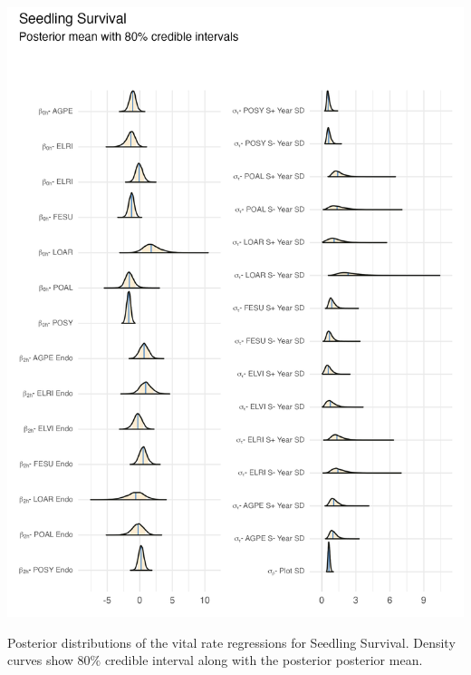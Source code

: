 \documentclass[lineno, sn-basic]{sn-jnl}%
\providecommand{\DIFaddbegin}{} %
\providecommand{\DIFaddend}{} %
\providecommand{\DIFdelbegin}{} %
\providecommand{\DIFdelend}{} %
\providecommand{\DIFaddbeginFL}{} %
\providecommand{\DIFaddendFL}{} %
\providecommand{\DIFdelbeginFL}{} %
\providecommand{\DIFdelendFL}{} %
\newcommand{\DIFscaledelfig}{0.5}
\newlength{\DIFdelgraphicswidth} %
\newlength{\DIFdelgraphicsheight} %
\newcommand{\DIFaddincludegraphics}[2][]{{\color{blue}\fbox{\DIFOincludegraphics[#1]{#2}}}} %
\newcommand{\DIFdelincludegraphics}[2][]{%
\sbox{\DIFdelgraphicsbox}{\DIFOincludegraphics[#1]{#2}}%
\settoboxwidth{\DIFdelgraphicswidth}{\DIFdelgraphicsbox} %
\settoboxtotalheight{\DIFdelgraphicsheight}{\DIFdelgraphicsbox} %
\scalebox{\DIFscaledelfig}{%
\parbox[b]{\DIFdelgraphicswidth}{\usebox{\DIFdelgraphicsbox}\\[-\baselineskip] \rule{\DIFdelgraphicswidth}{0em}}\llap{\resizebox{\DIFdelgraphicswidth}{\DIFdelgraphicsheight}{%
\setlength{\unitlength}{\DIFdelgraphicswidth}%
\begin{picture}(1,1)%
\thicklines\linethickness{2pt} %
{\color[rgb]{1,0,0}\put(0,0){\framebox(1,1){}}}%
{\color[rgb]{1,0,0}\put(0,0){\line( 1,1){1}}}%
{\color[rgb]{1,0,0}\put(0,1){\line(1,-1){1}}}%
\end{picture}%
}\hspace*{3pt}}} %
} %
\DeclareRobustCommand{\DIFaddbegin}{\DIFOaddbegin \let\includegraphics\DIFaddincludegraphics} %
\DeclareRobustCommand{\DIFaddend}{\DIFOaddend \let\includegraphics\DIFOincludegraphics} %
\DeclareRobustCommand{\DIFdelbegin}{\DIFOdelbegin \let\includegraphics\DIFdelincludegraphics} %
\DeclareRobustCommand{\DIFdelend}{\DIFOaddend \let\includegraphics\DIFOincludegraphics} %
\DeclareRobustCommand{\DIFaddbeginFL}{\DIFOaddbeginFL \let\includegraphics\DIFaddincludegraphics} %
\DeclareRobustCommand{\DIFaddendFL}{\DIFOaddendFL \let\includegraphics\DIFOincludegraphics} %
\DeclareRobustCommand{\DIFdelbeginFL}{\DIFOdelbeginFL \let\includegraphics\DIFdelincludegraphics} %
\DeclareRobustCommand{\DIFdelendFL}{\DIFOaddendFL \let\includegraphics\DIFOincludegraphics} %
\begin{document}
\DIFdelbegin %
\DIFdelendFL \DIFaddbeginFL \begin{myfigure}[H]
	\DIFaddendFL \centering
	\includegraphics[width = \linewidth]{seedsurv_posteriors_plot.png}
	\DIFdelbeginFL %
\DIFdelendFL \DIFaddbeginFL \caption[Posterior distributions of the vital rate regressions for Seedling Survival]{\DIFaddendFL Posterior distributions of the vital rate regressions for Seedling Survival. Density curves show $80\%$ credible interval along with the posterior posterior mean.}
\DIFdelbeginFL %
\DIFdelend \DIFaddbegin \end{myfigure}
\DIFaddend 
\end{document}
